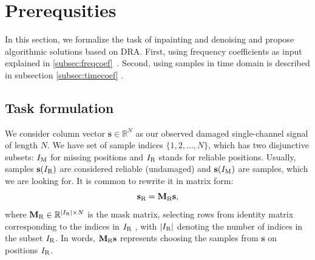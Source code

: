 \documentclass[conference]{IEEEtran}
\newcommand{\todo}[1]{\textcolor{red}{#1}}
\begin{document}
\section{Prerequsities}\label{sec:prereq} 


In this section, we formalize the task of inpainting and denoising and propose algorithmic solutions based on DRA.
First, using frequency coefficients as input explained in \ref{subsec:freqcoef}~\cite{Mokry2020}.
Second, using samples in time domain is described in subsection \ref{subsec:timecoef} \cite{Mokry2021}.


\subsection{Task formulation}

We consider column vector $ \mathbf{s} \in \mathbb{R}^{N} $ as our observed damaged single-channel signal of length $ N $.
We have set %
of sample indices $ \{1,2,\dots,N\} $, which has two disjunctive subsets: $I_\textup{M} $ for missing positions and $ I_\textup{R} $ stands for reliable positions.
Usually, samples $ \mathbf{s}(I_\textup{R}) $ are considered reliable (undamaged) and $ \mathbf{s}(I_\textup{M}) $ are samples, which we are looking for.
It is common to rewrite it in matrix form:
\begin{equation*}
	\mathbf{s}_{\textup{R}} = \mathbf{M}_{\textup{R}}\mathbf{s},
\end{equation*}
where $\mathbf{M}_\textup{R} \in \mathbb{R} ^ { |I_\textup{R}| \times N}$ is the mask matrix, selecting rows from identity matrix corresponding to the indices in $I_\textup{R}$ \cite{Adler2012}, with $ |I_\textup{R}|$ denoting the number of indices in the subset $I_\textup{R}$.
In words, $\mathbf{M}_{\textup{R}}\mathbf{s}$ represents choosing the samples from $\mathbf{s}$ on positions $I_\textup{R}$.
\end{document}
